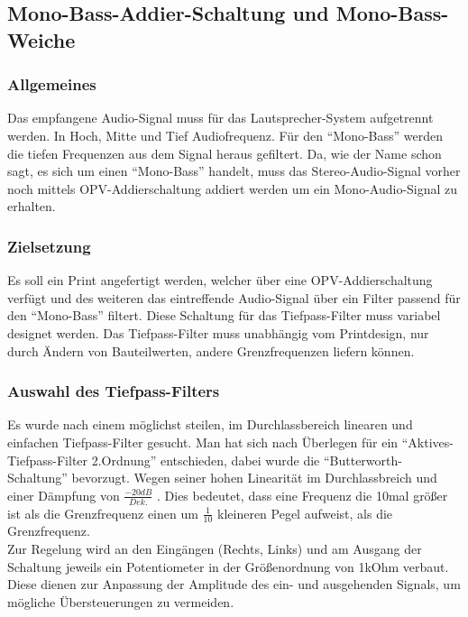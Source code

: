 \subsection{Mono-Bass-Addier-Schaltung und Mono-Bass-Weiche}
\subsubsection{Allgemeines}
Das empfangene Audio-Signal muss für das Lautsprecher-System aufgetrennt werden. In Hoch, Mitte und Tief Audiofrequenz. Für den \enquote{Mono-Bass} werden die tiefen Frequenzen aus dem Signal heraus gefiltert. Da, wie der Name schon sagt, es sich um einen \enquote{Mono-Bass} handelt, muss das Stereo-Audio-Signal vorher noch mittels OPV-Addierschaltung addiert werden um ein Mono-Audio-Signal zu erhalten.


\subsubsection{Zielsetzung}
Es soll ein Print angefertigt werden, welcher über eine OPV-Addierschaltung verfügt und des weiteren das eintreffende Audio-Signal über ein Filter passend für den \enquote{Mono-Bass} filtert.
Diese Schaltung für das Tiefpass-Filter muss variabel designet werden. Das Tiefpass-Filter muss unabhängig vom Printdesign, nur durch Ändern von Bauteilwerten, andere Grenzfrequenzen liefern können.




\subsubsection{Auswahl des Tiefpass-Filters}
Es wurde nach einem möglichst steilen, im Durchlassbereich linearen und einfachen Tiefpass-Filter gesucht. Man hat sich nach Überlegen für ein \enquote{Aktives-Tiefpass-Filter 2.Ordnung} entschieden, dabei wurde die \enquote{Butterworth-Schaltung} bevorzugt. Wegen seiner hohen Linearität im Durchlassbreich und einer Dämpfung von $\frac{-20dB}{Dek.}$ . Dies bedeutet, dass eine Frequenz die 10mal größer ist als die Grenzfrequenz einen um $\frac{1}{10}$ kleineren Pegel aufweist, als die Grenzfrequenz.\\
Zur Regelung wird an den Eingängen (Rechts, Links) und am Ausgang der Schaltung jeweils ein Potentiometer in der Größenordnung von 1kOhm verbaut. Diese dienen zur Anpassung der Amplitude des ein- und ausgehenden Signals, um mögliche Übersteuerungen zu vermeiden.

